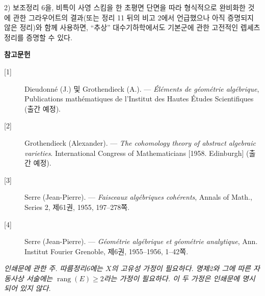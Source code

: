 2) 보조정리 6을, 비특이 사영 스킴을 한 초평면 단면을 따라 형식적으로
완비화한 것에 관한 그라우어트의 결과(또는 정리 11 뒤의 비고 2에서
언급했으나 아직 증명되지 않은 정리)와 함께 사용하면, ``추상''
대수기하학에서도 기본군에 관한 고전적인 렙셰츠 정리를 증명할 수 있다.

\begin{center}
  \textbf{참고문헌}
\end{center}

\begin{description}
  \item[{[1]}] Dieudonné (J.) 및 Grothendieck (A.). --- \emph{Éléments de
    géométrie algébrique}, Publications mathématiques de l'Institut des Hautes
    Études Scientifiques (출간 예정).
  \item[{[2]}] Grothendieck (Alexander). --- \emph{The cohomology theory of
    abstract algebraic varieties}. International Congress of Mathematicians
    [1958. Edinburgh] (출간 예정).
  \item[{[3]}] Serre (Jean-Pierre). --- \emph{Faisceaux algébriques
    cohérents}, Annals of Math., Series 2, 제61권, 1955, 197--278쪽.
  \item[{[4]}] Serre (Jean-Pierre). --- \emph{Géométrie algébrique et
    géométrie analytique}, Ann. Institut Fourier Grenoble, 제6권, 1955--1956,
    1--42쪽.
\end{description}

\par\smallskip
\begingroup\footnotesize
\noindent\textit{인쇄문에 관한 주. 따름정리6에는 $X$의 고유성 가정이 필요하다. 명제2와 그에 따른 자동사상 서술에는 $\operatorname{rang}(E)\geq2$라는 가정이 필요하다. 이 두 가정은 인쇄문에 명시되어 있지 않다.}\par
\endgroup
